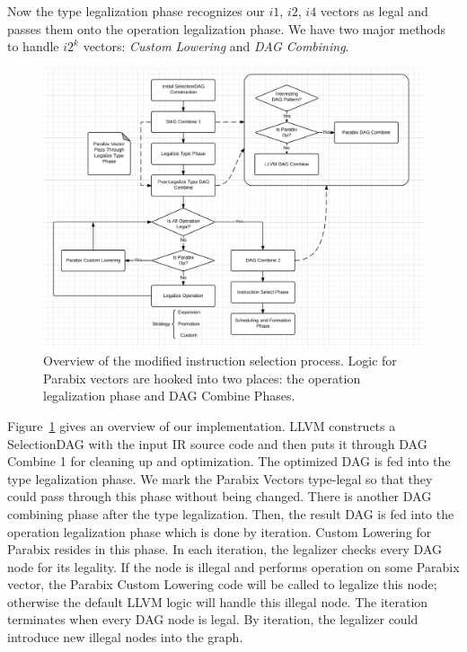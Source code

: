 Now the type legalization phase recognizes our $i1$, $i2$, $i4$ vectors as legal and passes them onto the operation legalization phase. We have two major methods to handle $i2^k$ vectors: \textit{Custom Lowering} and \textit{DAG Combining}.

\begin{figure}[ht!]
\centering
\includegraphics[width=140mm]{draw/system.png}
\caption[System overview: modified instruction selection process]{Overview of the modified instruction selection process. Logic for Parabix vectors are hooked into two places: the operation legalization phase and DAG Combine Phases.}
\label{figure:system}
\end{figure}

Figure~\ref{figure:system} gives an overview of our implementation. LLVM constructs a SelectionDAG with the input IR source code and then puts it through DAG Combine 1 for cleaning up and optimization. The optimized DAG is fed into the type legalization phase. We mark the Parabix Vectors type-legal so that they could pass through this phase without being changed. There is another DAG combining phase after the type legalization. Then, the result DAG is fed into the operation legalization phase which is done by iteration. Custom Lowering for Parabix resides in this phase. In each iteration, the legalizer checks every DAG node for its legality. If the node is illegal and performs operation on some Parabix vector, the Parabix Custom Lowering code will be called to legalize this node; otherwise the default LLVM logic will handle this illegal node. The iteration terminates when every DAG node is legal. By iteration, the legalizer could introduce new illegal nodes into the graph.

